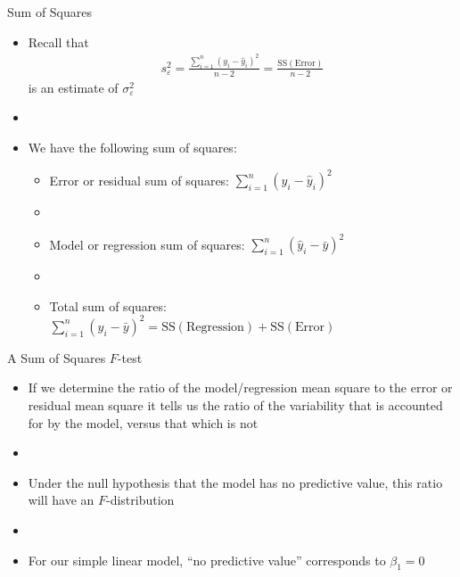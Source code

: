 \documentclass[xcolor=dvipsnames]{beamer}
\begin{document}
\begin{frame}{Sum of Squares}
	\begin{itemize}
		\item Recall that
		\begin{gather*}
		s^2_{\varepsilon} = \frac{\sum_{i=1}^{n}\left(y_i - \hat{y}_i\right)^2}{n-2} = \frac{\text{SS}(\text{Error})}{n-2}
		\end{gather*}
		is an estimate of $\sigma_{\varepsilon}^2$
		\item[]
		\item We have the following sum of squares:
		\begin{itemize}
			\item Error or residual sum of squares: $\sum_{i=1}^n (y_i - \hat{y}_i)^2$
			\item[]
			\item Model or regression sum of squares: $\sum_{i=1}^n (\hat{y}_i-\bar{y})^2$
			\item[]
			\item Total sum of squares: $\sum_{i=1}^n (y_i -\bar{y})^2 = \text{SS}(\text{Regression})+\text{SS}(\text{Error})$
		\end{itemize}
	\end{itemize}
\end{frame}

\begin{frame}{A Sum of Squares $F$-test}
	\begin{itemize}
		\item If we determine the ratio of the model/regression mean square to the error or residual mean square it tells us the ratio of the variability that is accounted for by the model, versus that which is not
		\item[]
		\item Under the null hypothesis that the model has no predictive value, this ratio will have an $F$-distribution 
		\item[]
		\item For our simple linear model, ``no predictive value'' corresponds to $\beta_1 = 0$
	\end{itemize}
\end{frame}
\end{document}

